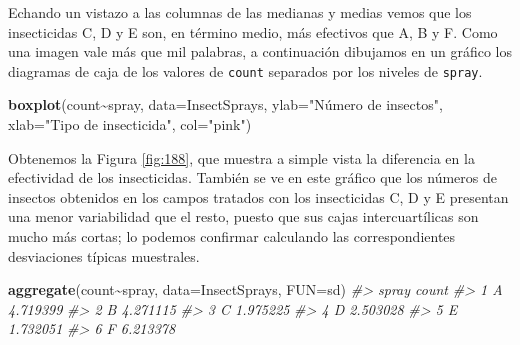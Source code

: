 \documentclass[
]{book}
\newenvironment{Shaded}{\begin{snugshade}}{\end{snugshade}}
\newcommand{\CommentTok}[1]{\textcolor[rgb]{0.56,0.35,0.01}{\textit{#1}}}
\newcommand{\DataTypeTok}[1]{\textcolor[rgb]{0.13,0.29,0.53}{#1}}
\newcommand{\KeywordTok}[1]{\textcolor[rgb]{0.13,0.29,0.53}{\textbf{#1}}}
\newcommand{\NormalTok}[1]{#1}
\newcommand{\OperatorTok}[1]{\textcolor[rgb]{0.81,0.36,0.00}{\textbf{#1}}}
\newcommand{\StringTok}[1]{\textcolor[rgb]{0.31,0.60,0.02}{#1}}
\theoremstyle{definition}
\theoremstyle{definition}
\theoremstyle{definition}
\theoremstyle{remark}
\begin{document}
Echando un vistazo a las columnas de las medianas y medias vemos que los insecticidas C, D y E son, en término medio, más efectivos que A, B y F. Como una imagen vale más que mil palabras, a continuación dibujamos en un gráfico los diagramas de caja de los valores de \texttt{count} separados por los niveles de \texttt{spray}.

\begin{Shaded}
\begin{Highlighting}[]
\KeywordTok{boxplot}\NormalTok{(count}\OperatorTok{\textasciitilde{}}\NormalTok{spray, }\DataTypeTok{data=}\NormalTok{InsectSprays, }\DataTypeTok{ylab=}\StringTok{"Número de insectos"}\NormalTok{, }
        \DataTypeTok{xlab=}\StringTok{"Tipo de insecticida"}\NormalTok{, }\DataTypeTok{col=}\StringTok{"pink"}\NormalTok{)}
\end{Highlighting}
\end{Shaded}

Obtenemos la Figura \ref{fig:188}, que muestra a simple vista la diferencia en la efectividad de los insecticidas. También se ve en este gráfico que los números de insectos obtenidos en los campos tratados con los insecticidas C, D y E presentan una menor variabilidad que el resto, puesto que sus cajas intercuartílicas son mucho más cortas; lo podemos confirmar calculando las correspondientes desviaciones típicas muestrales.

\begin{Shaded}
\begin{Highlighting}[]
\KeywordTok{aggregate}\NormalTok{(count}\OperatorTok{\textasciitilde{}}\NormalTok{spray, }\DataTypeTok{data=}\NormalTok{InsectSprays, }\DataTypeTok{FUN=}\NormalTok{sd)}
\CommentTok{\#\textgreater{}   spray    count}
\CommentTok{\#\textgreater{} 1     A 4.719399}
\CommentTok{\#\textgreater{} 2     B 4.271115}
\CommentTok{\#\textgreater{} 3     C 1.975225}
\CommentTok{\#\textgreater{} 4     D 2.503028}
\CommentTok{\#\textgreater{} 5     E 1.732051}
\CommentTok{\#\textgreater{} 6     F 6.213378}
\end{Highlighting}
\end{Shaded}
\end{document}
